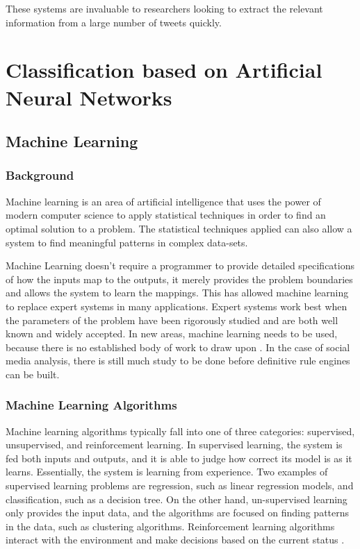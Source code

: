 These systems are invaluable to researchers looking to extract the relevant information from a large number of tweets quickly.

\pagebreak
\section{Classification based on Artificial Neural Networks}

\subsection{Machine Learning}

\subsubsection{Background}

Machine learning is an area of artificial intelligence that uses the power of modern computer science to apply statistical techniques in order to find an optimal solution to a problem\cite{understand_ml}. The statistical techniques applied can also allow a system to find meaningful patterns in complex data-sets\cite{intro_ml}.

Machine Learning doesn't require a programmer to provide detailed specifications of how the inputs map to the outputs, it merely provides the problem boundaries and allows the system to learn the mappings. This has allowed machine learning to replace expert systems in many applications\cite{Caudill_nn_primer}. Expert systems work best when the parameters of the problem have been rigorously studied and are both well known and widely accepted. In new areas, machine learning needs to be used, because there is no established body of work to draw upon \cite{intro_ml}. In the case of social media analysis, there is still much study to be done before definitive rule engines can be built.

\subsubsection{Machine Learning Algorithms}

Machine learning algorithms typically fall into one of three categories: supervised, unsupervised, and reinforcement learning\cite{Sutton:1998:IRL:551283}. In supervised learning, the system is fed both inputs and outputs, and it is able to judge how correct its model is as it learns\cite{intro_ml}. Essentially, the system is learning from experience. Two examples of supervised learning problems are regression, such as linear regression models, and classification, such as a decision tree. On the other hand, un-supervised learning only provides the input data\cite{Goodfellow_deeplearning}, and the algorithms are focused on finding patterns in the data, such as clustering algorithms. Reinforcement learning algorithms interact with the environment and make decisions based on the current status \cite{Sutton:1998:IRL:551283}.

